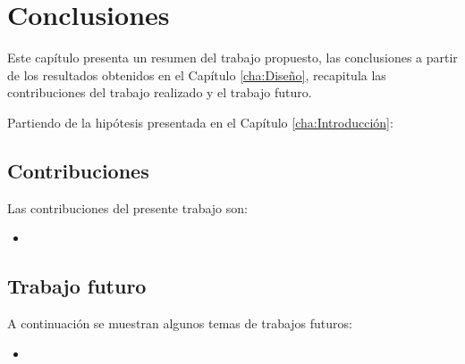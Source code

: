 \chapter{Conclusiones}
    \label{cha:Conclusiones}
Este capítulo presenta un resumen del trabajo propuesto, las conclusiones a partir de los resultados obtenidos en el Capítulo \ref{cha:Diseño}, recapitula las contribuciones del trabajo realizado y el trabajo futuro.



\vspace{0.3cm}

Partiendo de la hipótesis presentada en el Capítulo \ref{cha:Introducción}:





\section{Contribuciones}

Las contribuciones del presente trabajo son:

\begin{itemize}
	\item 
\end{itemize}

\section{Trabajo futuro}

A continuación se muestran algunos temas de trabajos futuros:

\begin{itemize}
\item
\end{itemize}

